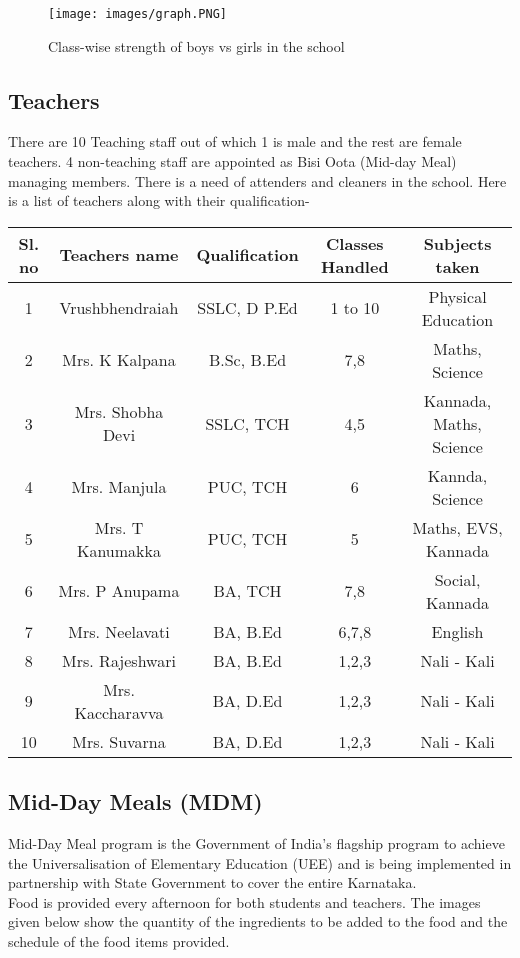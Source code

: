 \begin{figure}[H]
    \centering
    \texttt{[image: images/graph.PNG]}
    \caption{Class-wise strength of boys vs girls in the school}
\end{figure}

\subsection{Teachers}
There are 10 Teaching staff out of which 1 is male and the rest are female teachers. 4 non-teaching staff are appointed as Bisi Oota (Mid-day Meal) managing members. There is a need of attenders and cleaners in the school. Here is a list of teachers along with their qualification-

\begin{table}[H]
    \centering
    \begin{tabular}{c|c|c|c|c} \bottomrule \toprule 
        Sl. no & Teachers name & Qualification & Classes Handled & Subjects taken \\ \bottomrule \toprule 
        1 & Vrushbhendraiah & SSLC, D P.Ed & 1 to 10 & Physical Education \\ \hline 
        2 & Mrs. K Kalpana & B.Sc, B.Ed & 7,8 & Maths, Science \\ \hline 
        3 & Mrs. Shobha Devi & SSLC, TCH & 4,5 & Kannada, Maths, Science \\ \hline
        4 & Mrs. Manjula & PUC, TCH & 6 & Kannda, Science \\ \hline
        5 & Mrs. T Kanumakka & PUC, TCH & 5 & Maths, EVS, Kannada  \\ \hline
        6 & Mrs. P Anupama & BA, TCH & 7,8 & Social, Kannada \\ \hline
        7 & Mrs. Neelavati & BA, B.Ed & 6,7,8 & English \\ \hline
        8 & Mrs. Rajeshwari & BA, B.Ed & 1,2,3 & Nali - Kali \\ \hline 
        9 & Mrs. Kaccharavva & BA, D.Ed & 1,2,3 & Nali - Kali  \\ \hline
        10 & Mrs. Suvarna & BA, D.Ed & 1,2,3 & Nali - Kali  \\ \bottomrule \toprule 
    \end{tabular}
\end{table}

\subsection{Mid-Day Meals (MDM)}
Mid-Day Meal program is the Government of India's flagship program to achieve the Universalisation of Elementary Education (UEE) and is being implemented in partnership with State Government to cover the entire Karnataka. \\
Food is provided every afternoon for both students and teachers. The images given below show the quantity of the ingredients to be added to the food and the schedule of the food items provided. \\

